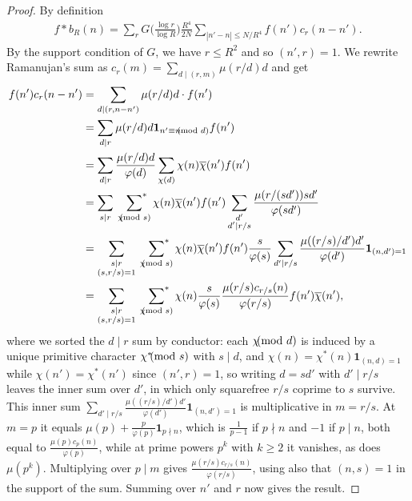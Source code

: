 \documentclass[12pt]{amsart}
\theoremstyle{definition}
\theoremstyle{remark}
\numberwithin{equation}{section}
\newcommand{\asum}{\sideset{}{^{\ast}}\sum}
\newcommand{\1}{\mathbf{1}}
\let\oldpmod\pmod
\renewcommand{\pmod}[1]{\hspace{-0.12cm}\oldpmod {#1}}
\begin{document}
\begin{proof}
    By definition
    \begin{align*}
        f*b_R(n)=\sum_{r}G\bigl( \frac{\log r}{\log R}\bigr)\frac{R^4}{2N} \sum_{|n'-n|\leq N/R^4} f(n')c_r(n-n').
    \end{align*}
    By the support condition of $G$, we have $r\leq R^2$ and so $(n',r)=1$. We rewrite Ramanujan's sum as $c_r(m)=\sum_{d\mid (r,m)}\mu(r/d)d$ and get 
\begin{align*}
     f(n')c_r(n-n')&=\sum_{d\mid (r,n-n')} \mu(r/d)d\cdot f(n')\\
    &=\sum_{d\mid r} \mu(r/d)d \1_{n'\equiv n \pmod d}f(n')\\
    &= \sum_{d\mid r} \frac{\mu(r/d)d }{\varphi(d)}\sum_{\chi(d)} \chi(n)\overline{\chi}(n')f(n')\\
    &=\sum_{s\mid r}\,\,\, \asum_{\chi\pmod s}\chi(n)\overline{\chi}(n') f(n') \sum_{\substack{d'\\ d'\mid r/s}} \frac{\mu(r/(sd'))sd'}{\varphi(sd')}\\
    &=\sum_{\substack{s\mid r\\ (s,r/s)=1}}\,\,\, \asum_{\chi\pmod s}\chi(n)\overline{\chi}(n') f(n') \frac{s}{\varphi(s)}\sum_{d' \mid r/s} \frac{\mu((r/s)/d')d'}{\varphi(d')}\1_{(n,d')=1} \\
    &=\sum_{\substack{s\mid r\\ (s,r/s)=1}}\,\,\,  \asum_{\chi\pmod s}\chi(n) \frac{s}{\varphi(s)}\frac{\mu(r/s)c_{r/s}(n)}{\varphi(r/s)} f(n')\overline{\chi}(n'),
\end{align*}
where we sorted the $d\mid r$ sum by conductor: each $\chi\pmod d$ is induced by a unique primitive character $\chi^\ast\pmod s$ with $s\mid d$, and $\chi(n)=\chi^\ast(n)\1_{(n,d)=1}$ while $\chi(n')=\chi^\ast(n')$ since $(n',r)=1$, so writing $d=sd'$ with $d'\mid r/s$ leaves the inner sum over $d'$, in which only squarefree $r/s$ coprime to $s$ survive. This inner sum $\sum_{d' \mid r/s} \frac{\mu((r/s)/d')d'}{\varphi(d')}\1_{(n,d')=1}$ is multiplicative in $m=r/s$. At $m=p$ it equals $\mu(p)+\frac{p}{\varphi(p)}\1_{p\nmid n}$, which is $\frac{1}{p-1}$ if $p\nmid n$ and $-1$ if $p\mid n$, both equal to $\frac{\mu(p)c_p(n)}{\varphi(p)}$, while at prime powers $p^k$ with $k\geq 2$ it vanishes, as does $\mu(p^k)$. Multiplying over $p\mid m$ gives $\frac{\mu(r/s)c_{r/s}(n)}{\varphi(r/s)}$, using also that $(n,s)=1$ in the support of the sum. Summing over $n'$ and $r$ now gives the result.
\end{proof}
\end{document}
